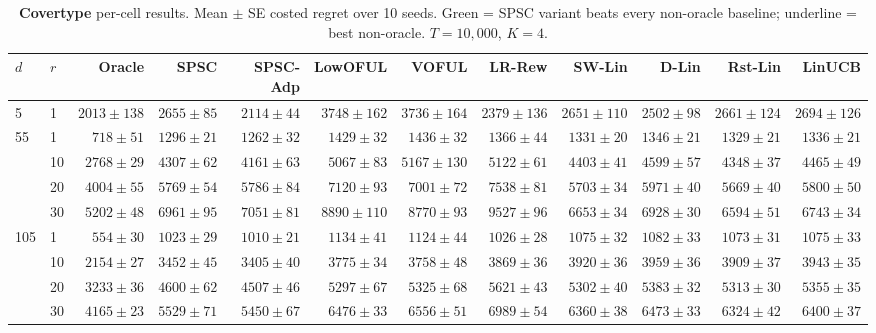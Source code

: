 \begin{table}[!htbp]
\centering
\caption{\textbf{Covertype} per-cell results. Mean $\pm$ SE costed regret over 10 seeds. Green = SPSC variant beats every non-oracle baseline; underline = best non-oracle. $T{=}10{,}000$, $K{=}4$.}
\label{tab:app-covertype}
\scriptsize
\setlength{\tabcolsep}{3pt}
\begin{tabular}{llrrrrrrrrrr}
\toprule
$d$ & $r$ & Oracle & \textbf{SPSC} & \textbf{SPSC-Adp} & LowOFUL & VOFUL & LR-Rew & SW-Lin & D-Lin & Rst-Lin & LinUCB \\
\midrule
5 & 1 & $2013{\pm}138$ & $2655{\pm}85$ & \cellcolor{green!12}$2114{\pm}44$ & $3748{\pm}162$ & $3736{\pm}164$ & \underline{$2379{\pm}136$} & $2651{\pm}110$ & $2502{\pm}98$ & $2661{\pm}124$ & $2694{\pm}126$ \\
55 & 1 & $718{\pm}51$ & \cellcolor{green!12}$1296{\pm}21$ & \cellcolor{green!12}$1262{\pm}32$ & $1429{\pm}32$ & $1436{\pm}32$ & $1366{\pm}44$ & $1331{\pm}20$ & $1346{\pm}21$ & \underline{$1329{\pm}21$} & $1336{\pm}21$ \\
 & 10 & $2768{\pm}29$ & \cellcolor{green!12}$4307{\pm}62$ & \cellcolor{green!12}$4161{\pm}63$ & $5067{\pm}83$ & $5167{\pm}130$ & $5122{\pm}61$ & $4403{\pm}41$ & $4599{\pm}57$ & \underline{$4348{\pm}37$} & $4465{\pm}49$ \\
 & 20 & $4004{\pm}55$ & $5769{\pm}54$ & $5786{\pm}84$ & $7120{\pm}93$ & $7001{\pm}72$ & $7538{\pm}81$ & $5703{\pm}34$ & $5971{\pm}40$ & \underline{$5669{\pm}40$} & $5800{\pm}50$ \\
 & 30 & $5202{\pm}48$ & $6961{\pm}95$ & $7051{\pm}81$ & $8890{\pm}110$ & $8770{\pm}93$ & $9527{\pm}96$ & $6653{\pm}34$ & $6928{\pm}30$ & \underline{$6594{\pm}51$} & $6743{\pm}34$ \\
105 & 1 & $554{\pm}30$ & \cellcolor{green!12}$1023{\pm}29$ & \cellcolor{green!12}$1010{\pm}21$ & $1134{\pm}41$ & $1124{\pm}44$ & \underline{$1026{\pm}28$} & $1075{\pm}32$ & $1082{\pm}33$ & $1073{\pm}31$ & $1075{\pm}33$ \\
 & 10 & $2154{\pm}27$ & \cellcolor{green!12}$3452{\pm}45$ & \cellcolor{green!12}$3405{\pm}40$ & $3775{\pm}34$ & \underline{$3758{\pm}48$} & $3869{\pm}36$ & $3920{\pm}36$ & $3959{\pm}36$ & $3909{\pm}37$ & $3943{\pm}35$ \\
 & 20 & $3233{\pm}36$ & \cellcolor{green!12}$4600{\pm}62$ & \cellcolor{green!12}$4507{\pm}46$ & \underline{$5297{\pm}67$} & $5325{\pm}68$ & $5621{\pm}43$ & $5302{\pm}40$ & $5383{\pm}32$ & $5313{\pm}30$ & $5355{\pm}35$ \\
 & 30 & $4165{\pm}23$ & \cellcolor{green!12}$5529{\pm}71$ & \cellcolor{green!12}$5450{\pm}67$ & $6476{\pm}33$ & $6556{\pm}51$ & $6989{\pm}54$ & $6360{\pm}38$ & $6473{\pm}33$ & \underline{$6324{\pm}42$} & $6400{\pm}37$ \\
\bottomrule
\end{tabular}
\end{table}

